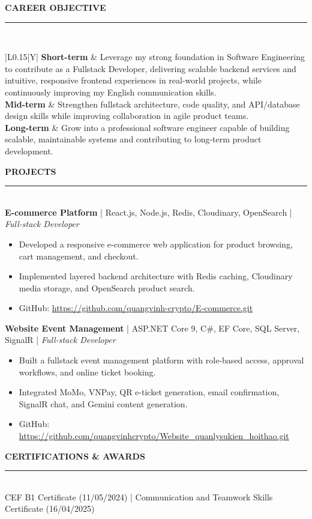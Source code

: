 \documentclass[11pt,a4paper]{article}
\newcommand{\sectionline}[1]{
  {\Large\bfseries\textcolor{headingblue}{#1}}\\[-2pt]
  \textcolor{linegray}{\rule{\linewidth}{0.5pt}}\\[-2pt]
}
\newcommand{\project}[3]{
  \textbf{#1} \;|\; #2 \;|\; \textit{#3}
}
\begin{document}
\vspace{2pt}
\sectionline{CAREER OBJECTIVE}
\begin{tabularx}{\linewidth}{|L{0.15\linewidth}|Y|}
	\hline
	\textbf{Short-term} & Leverage my strong foundation in Software Engineering to contribute as a Fullstack Developer, delivering scalable backend services and intuitive, responsive frontend experiences in real-world projects, while continuously improving my English communication skills. \\
	\hline
	\textbf{Mid-term}   & Strengthen fullstack architecture, code quality, and API/database design skills while improving collaboration in agile product teams.                                    \\
	\hline
	\textbf{Long-term}  & Grow into a professional software engineer capable of building scalable, maintainable systems and contributing to long-term product development.                         \\
	\hline
\end{tabularx}

\vspace{2pt}
\sectionline{PROJECTS}
\project{E-commerce Platform}{React.js, Node.js, Redis, Cloudinary, OpenSearch}{Full-stack Developer}
\begin{itemize}
	\setlength{\itemsep}{2pt}
	\setlength{\topsep}{2pt}
	\item Developed a responsive e-commerce web application for product browsing, cart management, and checkout.
	\item Implemented layered backend architecture with Redis caching, Cloudinary media storage, and OpenSearch product search.
	\item GitHub: \url{https://github.com/quangvinh-crypto/E-commerce.git}
\end{itemize}

\project{Website Event Management}{ASP.NET Core 9, C\#, EF Core, SQL Server, SignalR}{Full-stack Developer}
\begin{itemize}
	\setlength{\itemsep}{2pt}
	\setlength{\topsep}{2pt}
	\item Built a fullstack event management platform with role-based access, approval workflows, and online ticket booking.
	\item Integrated MoMo, VNPay, QR e-ticket generation, email confirmation, SignalR chat, and Gemini content generation.
	\item GitHub: \url{https://github.com/quangvinhcrypto/Website_quanlysukien_hoithao.git}
\end{itemize}

\vspace{2pt}
\sectionline{CERTIFICATIONS \& AWARDS}
CEF B1 Certificate (11/05/2024) \;|\; Communication and Teamwork Skills Certificate (16/04/2025)
\end{document}
